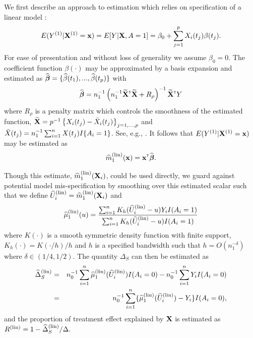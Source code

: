 \documentclass[useAMS,usenatbib,referee]{biom}
\begin{document}
We first describe an approach to estimation which relies on specification of a linear model \citep{Goldsmith2011}:
\begin{align}
    E(Y\sone| \bX\sone =\bx) = E[Y | \bX, A = 1] = \beta_0 + \sumjp X_i(t_j) \beta(t_j). \label{linear}
\end{align}
For ease of presentation and without loss of generality we assume $\beta_0 = 0$. The coefficient function $\beta(\cdot)$ may be approximated by a basis expansion and estimated as ${\widehat{\boldsymbol{\beta}}} = \{{\widehat\beta}(t_1), ..., {\widehat\beta}(t_p)\}$ with
\begin{align}
    {\widehat{\boldsymbol{\beta}}} = n_1^{-1}\left(n_1^{-1}{\widetilde {{\bf X}}}^{{\sf \scriptscriptstyle{T}}}{\widetilde {{\bf X}}} + R_\rho\right)^{-1}{\widetilde {{\bf X}}}^{{\sf \scriptscriptstyle{T}}} Y
\end{align}
where $R_\rho$ is a penalty matrix which controls the smoothness of the estimated function, ${\widetilde {{\bf X}}} = p^{-1}\left\{X_i(t_j) - \bar{ X}_i(t_j)\right\}_{j = 1, ..., p}$ and $\bar{ X}(t_j) = n_1^{-1} \sum_{i=1}^n X(t_j)I\{A_i = 1\}$. See, e.g., \citep{crambes2009smoothing, Reiss2017b, Wood2015}.
It follows that $E(Y^{(1)}| {\bf X}^{(1)} ={\bf x})$ may be estimated as
\begin{equation*}
    \widehat{m}_1^{(\text{lin})}({\bf x}) = {\bf x}^{{\sf \scriptscriptstyle{T}}}{\widehat{\boldsymbol{\beta}}}.
\end{equation*}

Though this estimate, $\widehat{m}_1^{(\text{lin})}({\bf X}_i)$, could be used directly, we guard against potential model mis-specification by smoothing over this estimated scalar such that we define $\widehat U^{(\text{lin})}_i = \widehat{m}_1^{(\text{lin})}({\bf X}_i)$ and $$\widehat \mu_1^{(\text{lin})} (u) = \frac{\sum_{i=1}^n K_h(\widehat U^{(\text{lin})}_i - u) Y_i I(A_i = 1)}{\sum_{i=1}^n K_h(\widehat U^{(\text{lin})}_i - u)  I(A_i = 1)}$$
where $K(\cdot)$ is a smooth symmetric density function with finite support, $K_h(\cdot) = K(\cdot/h)/h$ and $h$ is a specified bandwidth such that $h= O(n_1^{-\delta})$ where $\delta \in (1/4,1/2).$ The quantity $\Delta_S$ can then be estimated as \begin{eqnarray*}
\widehat \Delta_S^{(\text{lin})} &=& n_0^{-1} \sum_{i=1}^n \widehat{\mu}_1^{(\text{lin})}(\widehat{U}^{(\text{lin})}_i) I(A_i = 0) - n_0^{-1}\sum_{i=1}^n Y_i I(A_i = 0) \\
&=& n_0^{-1} \sum_{i=1}^n \{ \widehat{\mu}_1^{(\text{lin})}(\widehat{U}^{(\text{lin})}_i) - Y_i\}I(A_i = 0),
\end{eqnarray*}
and the proportion of treatment effect explained by ${\bf X}$ is estimated as $R^{(\text{lin})} = 1-\widehat \Delta_S^{(\text{lin})} / \Delta.$
\end{document}
